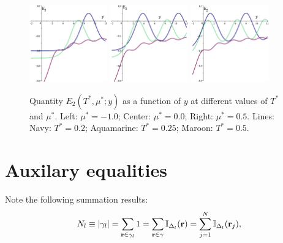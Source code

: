 \documentclass[12pt]{article}
\numberwithin{equation}{section}
\begin{document}
	\begin{figure}[htbp]
		\includegraphics[width=0.3\textwidth,angle=0]{images/E2y_vs_y_b1}
		\hfill
		\includegraphics[width=0.3\textwidth,angle=0]{images/E2y_vs_y_b2}
		\hfill
		\includegraphics[width=0.3\textwidth,angle=0]{images/E2y_vs_y_b3}
		\vfill
		\parbox{0.95\textwidth}{\caption{\label{fig:E2y_vs_y_b} Quantity $E_2(T^*,\mu^*;y)$ as a function of $y$ at different values of $T^*$ and $\mu^*$. Left: $\mu^*=-1.0$; Center: $\mu^*=0.0$; Right: $\mu^*=0.5$. Lines: Navy: $T^*=0.2$; Aquamarine: $T^*=0.25$; Maroon: $T^*=0.5$.}}
		
	\end{figure}
	
	\appendix
	
	\pagebreak
	
	\section{Auxilary equalities}
	Note the following summation results:
	\begin{equation}
		\label{eq:1}
		N_l \equiv \abs{\gamma_l} = \sum_{\vb{r} \in \gamma_l} 1 = \sum_{\vb{r} \in \gamma} \mathbb{I}_{\Delta_l}(\vb{r}) = \sum_{j=1}^{N} \mathbb{I}_{\Delta_{l}}(\vb{r}_j),
	\end{equation}
	
\end{document}
